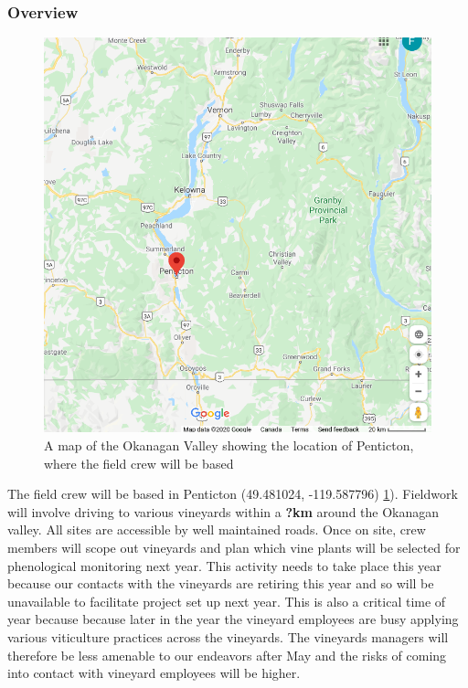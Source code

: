 \documentclass[11pt,letter]{article}
\begin{document}
\subsubsection{Overview}
\begin{figure}
  \includegraphics[width=\linewidth]{penticton.png}
  \caption{A map of the Okanagan Valley showing the location of Penticton, where the field crew will be based}
  \label{fig:OkanMap}
\end{figure}
The field crew will be based in Penticton (49.481024, -119.587796) \ref{fig:OkanMap}). Fieldwork will involve driving to various vineyards within a \textbf{?km} around the Okanagan valley. All sites are accessible by well maintained roads. Once on site, crew members will scope out vineyards and plan which vine plants will be selected for phenological monitoring next year. This activity needs to take place this year because our contacts with the vineyards are retiring this year and so will be unavailable to facilitate project set up next year. This is also a critical time of year because because later in the year the vineyard employees are busy applying various viticulture practices across the vineyards. The vineyards managers will therefore be less amenable to our endeavors after May and the risks of coming into contact with vineyard employees will be higher.   
\end{document}
